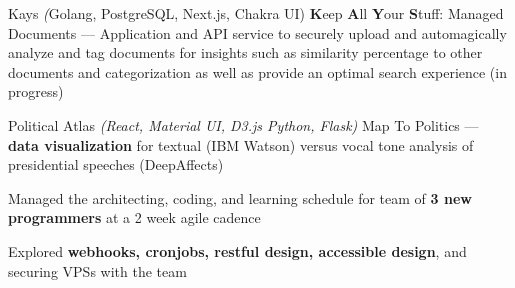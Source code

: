 

\begin{cventries}


\cventryproject
    {Kays} %
    {\emph(Golang, PostgreSQL, Next.js, Chakra UI)}
    {} %
    {\textbf{K}eep \textbf{A}ll \textbf{Y}our \textbf{S}tuff: Managed Documents --- Application and API service to securely upload and automagically analyze and tag documents for insights such as similarity percentage to other documents and categorization as well as provide an optimal search experience (in progress)} %
    {}

\cventryproject
    {Political Atlas} %
    {\emph{(React, Material UI, D3.js Python, Flask)}}
    {} %
    {Map To Politics --- \textbf{data visualization} for textual (IBM Watson) versus vocal tone analysis of presidential speeches (DeepAffects)} %
    {
      \begin{cvitems} %
        \item {Managed the architecting, coding, and learning schedule for team of \textbf{3 new programmers} at a 2 week agile cadence}
        \item {Explored \textbf{webhooks, cronjobs, restful design, accessible design}, and securing VPSs with the team}
      \end{cvitems}
    }

\end{cventries}
